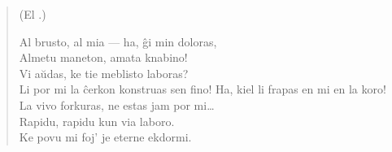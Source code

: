 \begin{verse}
\begin{center}
\footnotesize (El .)
\end{center}
               Al brusto, al mia --- ha, \^gi min doloras,\\
               Almetu maneton, amata knabino!\\
               Vi a\u udas, ke tie meblisto laboras?\\
               Li por mi la \^cerkon konstruas sen fino!
\newpage
               Ha, kiel li frapas en mi en la koro!\\
               La vivo forkuras, ne estas jam por mi\dots\\
               Rapidu, rapidu kun via laboro.\\
               Ke povu mi foj' je eterne ekdormi.
               
\end{verse}


\smallrule{}